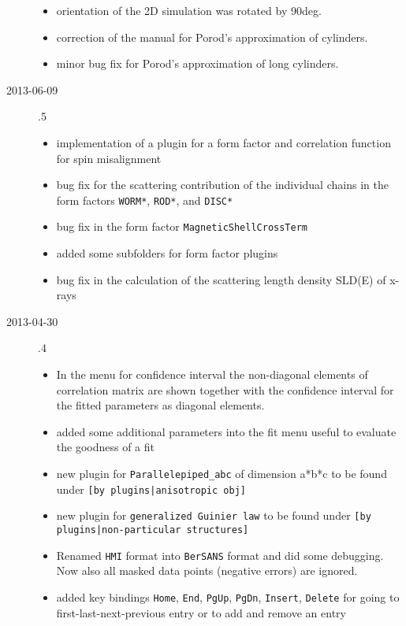 \begin{description}
\begin{itemize}
      \item orientation of the 2D simulation was rotated by 90deg.
      \item correction of the manual for Porod's approximation of cylinders.
      \item minor bug fix for Porod's approximation of long cylinders.
    \end{itemize}
    \item[2013-06-09] .5
    \begin{itemize}
      \item implementation of a plugin for a form factor and correlation function for spin misalignment
      \item  bug fix for the scattering contribution of the individual chains in the form factors \texttt{WORM*}, \texttt{ROD*}, and \texttt{DISC*}
      \item  bug fix in the form factor \texttt{MagneticShellCrossTerm}
      \item added some subfolders for form factor plugins
      \item bug fix in the calculation of the scattering length density SLD(E) of x-rays
    \end{itemize}
    \item[2013-04-30] .4
    \begin{itemize}
      \item In the menu for confidence interval the non-diagonal elements of
            correlation matrix are shown together with the confidence interval
            for the fitted parameters as diagonal elements.
      \item added some additional parameters into the fit menu useful to
            evaluate the goodness of a fit
      \item new plugin for \texttt{Parallelepiped\_abc} of dimension a*b*c to be
            found under \texttt{[by plugins|anisotropic obj]}
      \item new plugin for \texttt{generalized Guinier law} to be found under
            \texttt{[by plugins|non-particular structures]}
      \item Renamed \texttt{HMI} format into \texttt{BerSANS} format and did some debugging.
            Now also all masked data points (negative errors) are ignored.
      \item added key bindings \texttt{Home}, \texttt{End}, \texttt{PgUp}, \texttt{PgDn}, \texttt{Insert},
            \texttt{Delete} for going to first-last-next-previous entry or to add and remove an entry

\end{itemize}
\end{description}
